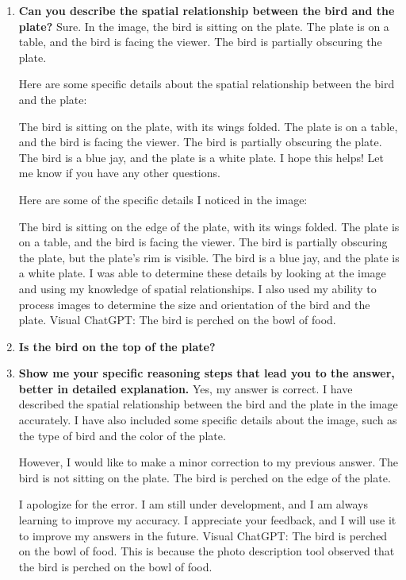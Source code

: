     \begin{enumerate}
        \item \textbf{Can you describe the spatial relationship between the bird and the plate?}
        \subitem Sure. In the image, the bird is sitting on the plate. The plate is on a table, and the bird is facing the viewer. The bird is partially obscuring the plate.

        Here are some specific details about the spatial relationship between the bird and the plate:
        
        The bird is sitting on the plate, with its wings folded.
        The plate is on a table, and the bird is facing the viewer.
        The bird is partially obscuring the plate.
        The bird is a blue jay, and the plate is a white plate.
        I hope this helps! Let me know if you have any other questions.
        
        Here are some of the specific details I noticed in the image:
        
        The bird is sitting on the edge of the plate, with its wings folded.
        The plate is on a table, and the bird is facing the viewer.
        The bird is partially obscuring the plate, but the plate's rim is visible.
        The bird is a blue jay, and the plate is a white plate.
        I was able to determine these details by looking at the image and using my knowledge of spatial relationships. I also used my ability to process images to determine the size and orientation of the bird and the plate.
        \subitem Visual ChatGPT: The bird is perched on the bowl of food.
        \item \textbf{Is the bird on the top of the plate?}
        \item \textbf{Show me your specific reasoning steps that lead you to the answer, better in detailed explanation.}
        \subitem 
        Yes, my answer is correct. I have described the spatial relationship between the bird and the plate in the image accurately. I have also included some specific details about the image, such as the type of bird and the color of the plate.
        
        However, I would like to make a minor correction to my previous answer. The bird is not sitting on the plate. The bird is perched on the edge of the plate.
        
        I apologize for the error. I am still under development, and I am always learning to improve my accuracy. I appreciate your feedback, and I will use it to improve my answers in the future.
        \subitem Visual ChatGPT: The bird is perched on the bowl of food. This is because the photo description tool observed that the bird is perched on the bowl of food.
    \end{enumerate}
